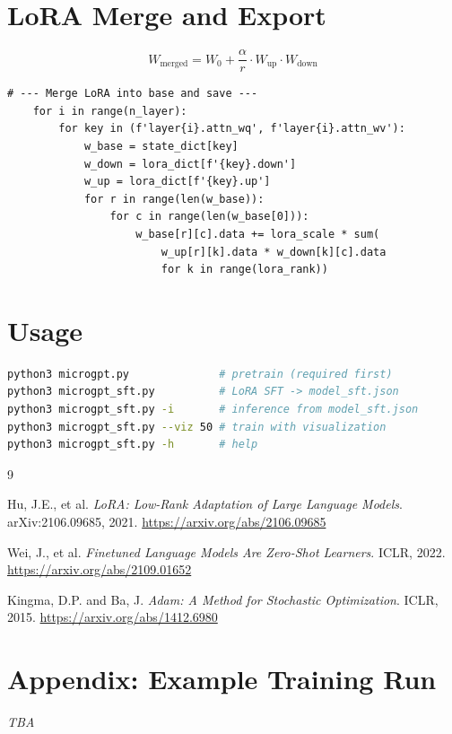 \documentclass[11pt,a4paper]{article}
\begin{document}
\section{LoRA Merge and Export}

\[
W_{\text{merged}} = W_0 + \frac{\alpha}{r} \cdot W_{\text{up}} \cdot W_{\text{down}}
\]

\begin{lstlisting}[firstnumber=268]
    # --- Merge LoRA into base and save ---
    for i in range(n_layer):
        for key in (f'layer{i}.attn_wq', f'layer{i}.attn_wv'):
            w_base = state_dict[key]
            w_down = lora_dict[f'{key}.down']
            w_up = lora_dict[f'{key}.up']
            for r in range(len(w_base)):
                for c in range(len(w_base[0])):
                    w_base[r][c].data += lora_scale * sum(
                        w_up[r][k].data * w_down[k][c].data
                        for k in range(lora_rank))
\end{lstlisting}

\section{Usage}

\begin{lstlisting}[language=bash]
python3 microgpt.py              # pretrain (required first)
python3 microgpt_sft.py          # LoRA SFT -> model_sft.json
python3 microgpt_sft.py -i       # inference from model_sft.json
python3 microgpt_sft.py --viz 50 # train with visualization
python3 microgpt_sft.py -h       # help
\end{lstlisting}

\begin{thebibliography}{9}

Hu, J.E., et al. \textit{LoRA: Low-Rank Adaptation of Large Language Models}. arXiv:2106.09685, 2021.
\url{https://arxiv.org/abs/2106.09685}

Wei, J., et al. \textit{Finetuned Language Models Are Zero-Shot Learners}. ICLR, 2022.
\url{https://arxiv.org/abs/2109.01652}

Kingma, D.P. and Ba, J. \textit{Adam: A Method for Stochastic Optimization}. ICLR, 2015.
\url{https://arxiv.org/abs/1412.6980}

\end{thebibliography}

\newpage
\section*{Appendix: Example Training Run}

\textit{TBA}
\end{document}
